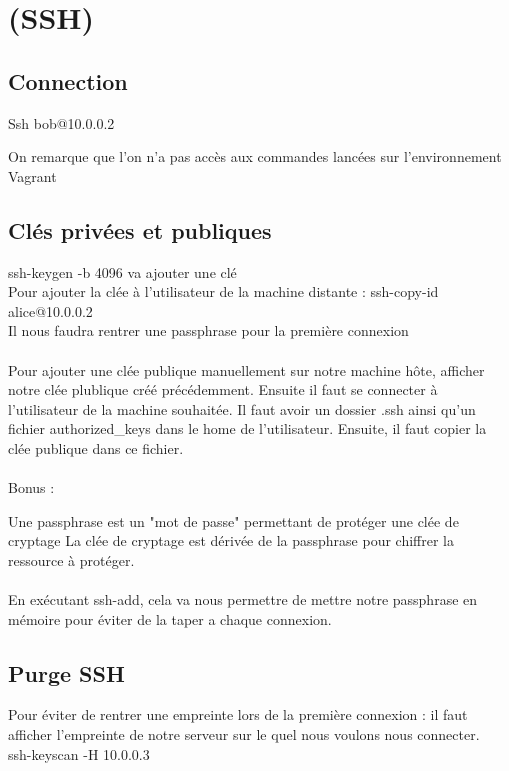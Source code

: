 \documentclass{article}
\begin{document}
\section{(SSH)}

\subsection{Connection}
\noindent Ssh bob@10.0.0.2

On remarque que l'on n'a pas accès aux commandes lancées sur l'environnement Vagrant

\subsection{Clés privées et publiques} %

\noindent ssh-keygen -b 4096 va ajouter une clé
\\
Pour ajouter la clée à l’utilisateur de la machine distante : ssh-copy-id alice@10.0.0.2
\\
Il nous faudra rentrer une passphrase pour la première connexion
\\
\\
Pour ajouter une clée publique manuellement sur notre machine hôte,  afficher notre clée plublique créé précédemment. Ensuite il faut se connecter à l'utilisateur de la machine souhaitée.
Il faut avoir un dossier .ssh ainsi qu'un fichier authorized\_keys dans le home de l'utilisateur. Ensuite, il faut copier la clée publique dans ce fichier.
\\
\\
Bonus :

\noindent Une passphrase est un "mot de passe" permettant de protéger une clée de cryptage
La clée de cryptage est dérivée de la passphrase pour chiffrer la ressource à protéger.
\\
\\
En exécutant ssh-add, cela va nous permettre de mettre notre passphrase en mémoire pour éviter de la taper a chaque connexion.

\subsection{Purge SSH} %

\noindent Pour éviter de rentrer une empreinte lors de la première connexion :
il faut afficher l’empreinte de notre serveur sur le quel nous voulons nous connecter.
\\
\noindent ssh-keyscan -H 10.0.0.3
\end{document}
